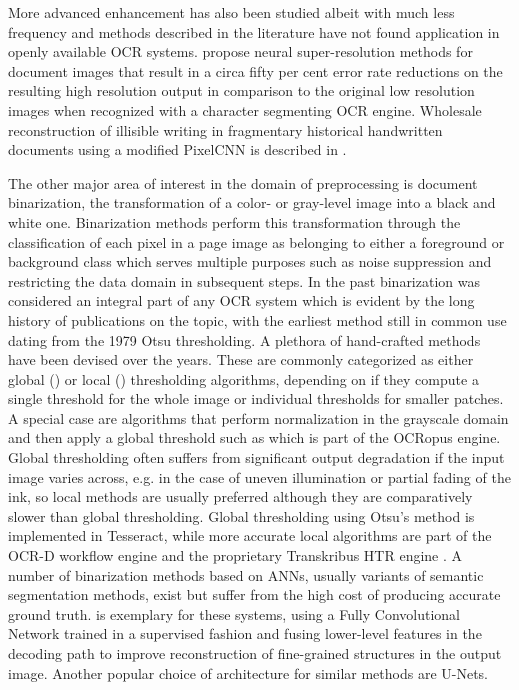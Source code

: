 More advanced enhancement has also been studied albeit with much less frequency
and methods described in the literature have not found application in openly
available OCR systems. \cite{dong2015boosting,lat2018enhancing,fu2019cascaded}
propose neural super-resolution methods for document images that result in a
circa fifty per cent error rate reductions on the resulting high resolution
output in comparison to the original low resolution images when recognized with
a character segmenting OCR engine. Wholesale reconstruction of illisible
writing in fragmentary historical handwritten documents using a modified
PixelCNN is described in \cite{uzan2017qumran}. 

The other major area of interest in the domain of preprocessing is document
binarization, the transformation of a color- or gray-level image into a black
and white one. Binarization methods perform this transformation through the
classification of each pixel in a page image as belonging to either a
foreground or background class which serves multiple purposes such as noise
suppression and restricting the data domain in subsequent steps. In the past
binarization was considered an integral part of any OCR system which is evident
by the long history of publications on the topic, with the earliest method
still in common use dating from the 1979 Otsu
thresholding\cite{otsu1979threshold}. A plethora of hand-crafted methods have
been devised over the years. These are commonly categorized as either global
(\cite{otsu1979threshold}) or local
(\cite{sauvola2000adaptive,niblack1986introduction,kim2002document,gatos2004adaptive})
thresholding algorithms, depending on if they compute a single threshold for
the whole image or individual thresholds for smaller patches. A special case
are algorithms that perform normalization in the grayscale domain and then
apply a global threshold such as \cite{shafait2008efficient} which is part of
the OCRopus engine. Global thresholding often suffers from significant output
degradation if the input image varies across, e.g. in the case of uneven
illumination or partial fading of the ink, so local methods are usually
preferred although they are comparatively slower than global thresholding.
Global thresholding using Otsu's method is implemented in Tesseract, while more
accurate local algorithms are part of the OCR-D workflow engine
\cite{neudecker2019ocr} and the proprietary Transkribus HTR engine
\cite{ntirogiannis2014combined}. A number of binarization methods based on
ANNs, usually variants of semantic segmentation methods, exist but suffer from
the high cost of producing accurate ground truth. \cite{tensmeyer2017document}
is exemplary for these systems, using a Fully Convolutional Network
\cite{long2015fully} trained in a supervised fashion and fusing lower-level
features in the decoding path to improve reconstruction of fine-grained
structures in the output image.  Another popular choice of architecture for
similar methods are U-Nets\cite{ronneberger2015u}.


